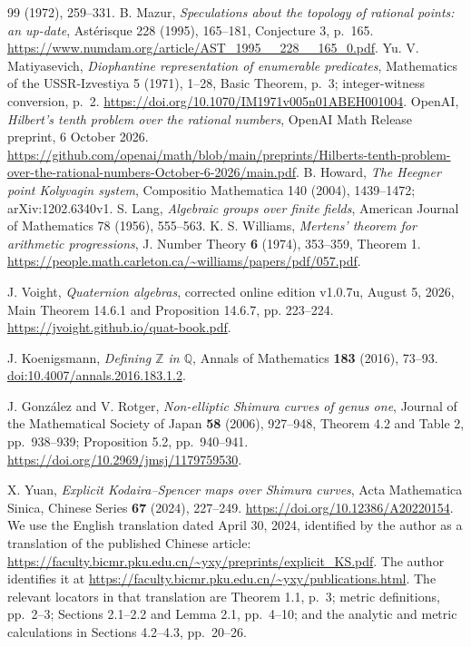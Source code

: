 \documentclass[11pt]{article}
\theoremstyle{definition}
\theoremstyle{remark}
\begin{document}
\begin{thebibliography}{99}
(1972), 259--331.
 B. Mazur,
\emph{Speculations about the topology of rational points: an up-date},
Ast\'erisque 228 (1995), 165--181, Conjecture 3, p.~165.
\url{https://www.numdam.org/article/AST_1995__228__165_0.pdf}.
 Yu. V. Matiyasevich,
\emph{Diophantine representation of enumerable predicates},
Mathematics of the USSR-Izvestiya 5 (1971), 1--28,
Basic Theorem, p.~3; integer-witness conversion, p.~2.
\url{https://doi.org/10.1070/IM1971v005n01ABEH001004}.
 OpenAI,
\emph{Hilbert's tenth problem over the rational numbers},
OpenAI Math Release preprint, 6 October 2026.
\url{https://github.com/openai/math/blob/main/preprints/Hilberts-tenth-problem-over-the-rational-numbers-October-6-2026/main.pdf}.
 B. Howard, \emph{The Heegner point Kolyvagin system},
Compositio Mathematica 140 (2004), 1439--1472; arXiv:1202.6340v1.
 S. Lang, \emph{Algebraic groups over finite fields},
American Journal of Mathematics 78 (1956), 555--563.
K. S. Williams, \emph{Mertens' theorem for arithmetic progressions},
J. Number Theory \textbf{6} (1974), 353--359, Theorem 1.
\url{https://people.math.carleton.ca/~williams/papers/pdf/057.pdf}.

J. Voight, \emph{Quaternion algebras}, corrected online edition
v1.0.7u, August 5, 2026, Main Theorem 14.6.1 and Proposition 14.6.7,
pp. 223--224.
\url{https://jvoight.github.io/quat-book.pdf}.


 J. Koenigsmann,
\emph{Defining $\mathbb Z$ in $\mathbb Q$},
Annals of Mathematics \textbf{183} (2016), 73--93.
\href{https://doi.org/10.4007/annals.2016.183.1.2}{doi:10.4007/annals.2016.183.1.2}.

 J. Gonz\'alez and V. Rotger,
\emph{Non-elliptic Shimura curves of genus one},
Journal of the Mathematical Society of Japan \textbf{58} (2006), 927--948,
Theorem 4.2 and Table 2, pp.~938--939; Proposition 5.2, pp.~940--941.
\url{https://doi.org/10.2969/jmsj/1179759530}.

 X. Yuan,
\emph{Explicit Kodaira--Spencer maps over Shimura curves},
Acta Mathematica Sinica, Chinese Series \textbf{67} (2024), 227--249.
\url{https://doi.org/10.12386/A20220154}.
We use the English translation dated April 30, 2024, identified by
the author as a translation of the published Chinese article:
\url{https://faculty.bicmr.pku.edu.cn/~yxy/preprints/explicit_KS.pdf}.
The author identifies it at
\url{https://faculty.bicmr.pku.edu.cn/~yxy/publications.html}.
The relevant locators in that translation are Theorem 1.1, p.~3;
metric definitions, pp.~2--3; Sections 2.1--2.2 and Lemma 2.1,
pp.~4--10; and the analytic and metric calculations in Sections
4.2--4.3, pp.~20--26.


\end{thebibliography}
\end{document}
